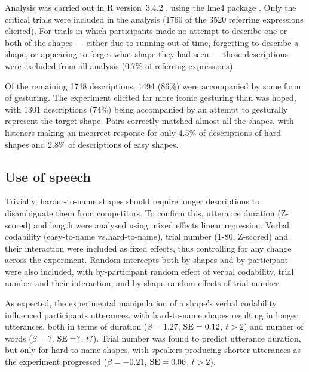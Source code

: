 \documentclass[a4paper,man,natbib]{apa6}
\newcommand{\resultsLM}[3]{$\beta = #1$, $\textnormal{SE} = #2$, $t #3$}
\begin{document}
Analysis was carried out in R version~3.4.2 \citep{rbase}, using the lme4 package \citep{lme4}.
Only the critical trials were included in the analysis (1760 of the 3520 referring expressions elicited).
For trials in which participants made no attempt to describe one or both of the shapes --- either due to running out of time, forgetting to describe a shape, or appearing to forget what shape they had seen --- those descriptions were excluded from all analysis (0.7\% of referring expressions).

Of the remaining 1748 descriptions, 1494 (86\%) were accompanied by some form of gesturing. 
The experiment elicited far more iconic gesturing than was hoped, with 1301 descriptions (74\%) being accompanied by an attempt to gesturally represent the target shape.
Pairs correctly matched almost all the shapes, with listeners making an incorrect response for only 4.5\% of descriptions of hard shapes and 2.8\% of descriptions of easy shapes.

\subsection{Use of speech}
Trivially, harder-to-name shapes should require longer descriptions to disambiguate them from competitors. 
To confirm this, utterance duration (Z-scored) and length were analysed using mixed effects linear regression.
Verbal codability (easy-to-name vs.\@ hard-to-name), trial number (1-80, Z-scored) and their interaction were included as fixed effects, thus controlling for any change across the experiment.
Random intercepts both by-shapes and by-participant were also included, with by-participant random effect of verbal codability, trial number and their interaction, and by-shape random effects of trial number.

As expected, the experimental manipulation of a shape's verbal codability influenced participants utterances, with hard-to-name shapes resulting in longer utterances, both in terms of duration (\resultsLM{1.27}{0.12}{>2}) and number of words (\resultsLM{?}{?}{?}).
Trial number was found to predict utterance duration, but only for hard-to-name shapes, with speakers producing shorter utterances as the experiment progressed (\resultsLM{-0.21}{0.06}{>2}).
\end{document}
